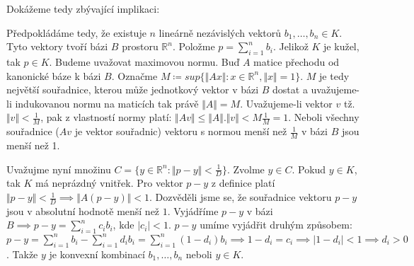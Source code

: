\documentclass[12pt, a4paper]{article}
\begin{document}
Dokážeme tedy zbývající implikaci:

Předpokládáme tedy, že existuje $n$ lineárně nezávislých vektorů $b_1,\dots,b_n \in K$. Tyto vektory tvoří bázi $B$ prostoru $\mathbb{R}^n$. Položme $p = \sum_{i=1}^n b_i$. Jelikož $K$ je kužel, tak $p \in K$. Budeme uvažovat maximovou normu. Buď $A$ matice přechodu od kanonické báze k bázi $B$. Označme $M \coloneqq sup\{\Vert Ax \Vert: x \in \mathbb{R}^n, \Vert x \Vert = 1\}$. $M$ je tedy největší souřadnice, kterou může jednotkový vektor v bázi $B$ dostat a uvažujeme-li indukovanou normu na maticích tak právě $\Vert A \Vert = M$. Uvažujeme-li vektor $v$ tž. $\Vert v \Vert < \frac{1}{M}$, pak z vlastností normy platí: $\Vert Av \Vert \leq \Vert A \Vert . \Vert v \Vert < M \frac{1}{M} = 1$. Neboli všechny souřadnice ($Av$ je vektor souřadnic) vektoru s normou menší než $\frac{1}{M}$ v bázi $B$ jsou menší než 1.

Uvažujme nyní množinu $C = \{y \in \mathbb{R}^n: \Vert p - y \Vert < \frac{1}{D}\}$. Zvolme $y \in C$. Pokud $y \in K$, tak $K$ má neprázdný vnitřek. Pro vektor $p-y$ z definice platí $\Vert p-y \Vert < \frac{1}{D} \implies \Vert A(p-y) \Vert < 1$. Dozvěděli jsme se, že souřadnice vektoru $p-y$ jsou v absolutní hodnotě menší než $1$. Vyjádříme $p-y$ v bázi $B \implies p-y = \sum_{i=1}^n c_i b_i$, kde $|c_i| < 1$. $p-y$ umíme vyjádřit druhým způsobem: $p-y = \sum_{i=1}^n b_i - \sum_{i=1}^n d_i b_i = \sum_{i=1}^n (1-d_i)b_i \implies 1-d_i = c_i \implies |1-d_i| < 1 \implies d_i > 0$. Takže $y$ je konvexní kombinací $b_1,\dots, b_n$ neboli $y \in K$.
\end{document}
